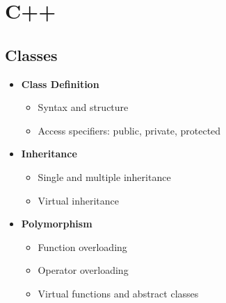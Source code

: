 \documentclass{article}
\begin{document}
\section{C++}
    \subsection{Classes}
      \begin{itemize}
        \item \textbf{Class Definition}
          \begin{itemize}
            \item Syntax and structure
            \item Access specifiers: public, private, protected
          \end{itemize}
        \item \textbf{Inheritance}
          \begin{itemize}
            \item Single and multiple inheritance
            \item Virtual inheritance
          \end{itemize}
        \item \textbf{Polymorphism}
          \begin{itemize}
            \item Function overloading
            \item Operator overloading
            \item Virtual functions and abstract classes
          \end{itemize}
      \end{itemize}
\end{document}
